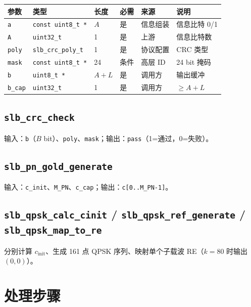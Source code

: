 \documentclass[11pt,a4paper]{ctexart}
\begin{document}
\begin{longtable}{p{2.2cm}p{2.8cm}p{1.2cm}p{1.5cm}p{2.2cm}p{4.5cm}}
\toprule
\textbf{参数} & \textbf{类型} & \textbf{长度} & \textbf{必需} & \textbf{来源} & \textbf{说明} \\
\midrule
\endhead
\texttt{a} & \texttt{const uint8\_t *} & $A$ & 是 & 信息组装 & 信息比特 0/1 \\
\texttt{A} & \texttt{uint32\_t} & 1 & 是 & 上游 & 信息比特数 \\
\texttt{poly} & \texttt{slb\_crc\_poly\_t} & 1 & 是 & 协议配置 & CRC 类型 \\
\texttt{mask} & \texttt{const uint8\_t *} & 24 & 条件 & 高层 ID & 24 bit 掩码 \\
\texttt{b} & \texttt{uint8\_t *} & $A{+}L$ & 是 & 调用方 & 输出缓冲 \\
\texttt{b\_cap} & \texttt{uint32\_t} & 1 & 是 & 调用方 & $\geq A{+}L$ \\
\bottomrule
\end{longtable}

\subsection{\texttt{slb\_crc\_check}}

输入：\texttt{b}（$B$ bit）、\texttt{poly}、\texttt{mask}；输出：\texttt{pass}（1=通过，0=失败）。

\subsection{\texttt{slb\_pn\_gold\_generate}}

输入：\texttt{c\_init}、\texttt{M\_PN}、\texttt{c\_cap}；输出：\texttt{c[0..M\_PN-1]}。

\subsection{\texttt{slb\_qpsk\_calc\_cinit} / \texttt{slb\_qpsk\_ref\_generate} / \texttt{slb\_qpsk\_map\_to\_re}}

分别计算 $c_{\mathrm{init}}$、生成 161 点 QPSK 序列、映射单个子载波 RE（$k{=}80$ 时输出 $(0,0)$）。

\section{处理步骤}
\end{document}
